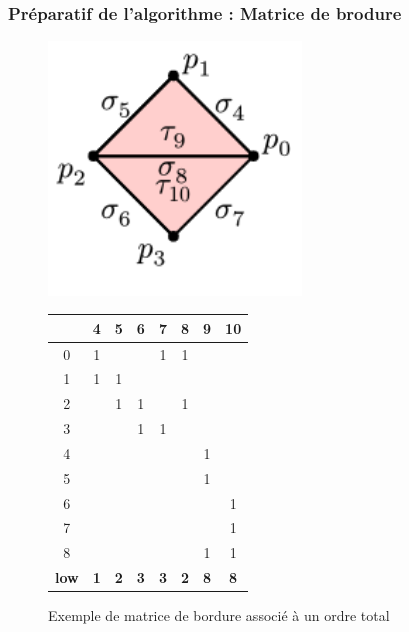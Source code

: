 \documentclass{beamer}
\begin{document}
\begin{frame}
    \frametitle{Préparatif de l'algorithme : Matrice de brodure}
    \fontsize{8}{10}\selectfont
    \begin{figure}[h]
        \centering
        \begin{minipage}[c]{0.45\linewidth}
            \centering
            \includegraphics[width=0.6\textwidth]{"../images/notationSimplexe.png"} 
        \end{minipage}
        \hfill
        \begin{tabular}{ c | c | c | c | c | c | c | c }
                & 4 & 5 & 6 & 7 & 8 & 9 & 10 \\ \hline
            0   & 1 &   &   & 1 & 1 &   &    \\ \hline
            1   & 1 & 1 &   &   &   &   &    \\ \hline
            2   &   & 1 & 1 &   & 1 &   &    \\ \hline
            3   &   &   & 1 & 1 &   &   &    \\ \hline
            4   &   &   &   &   &   & 1 &    \\ \hline
            5   &   &   &   &   &   & 1 &    \\ \hline
            6   &   &   &   &   &   &   & 1  \\ \hline
            7   &   &   &   &   &   &   & 1  \\ \hline
            8   &   &   &   &   &   & 1 & 1  \\ \hline
            \textbf{low} & \textbf{1} & \textbf{2} & \textbf{3} & 
            \textbf{3} & \textbf{2} & \textbf{8} & \textbf{8}
        \end{tabular}
        
        \caption{Exemple de matrice de bordure associé à un ordre total}
    \end{figure}
\end{frame}
\end{document}
